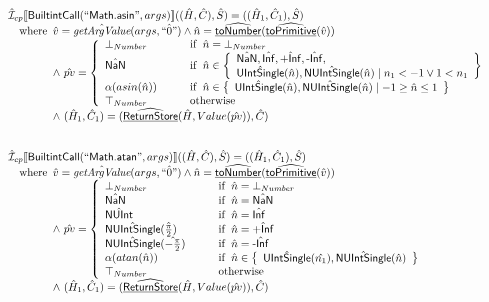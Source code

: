 \[\begin{array}{l}
\aI _{cp}\lbr \SF{BuiltintCall}(``\SF{Math.asin}",args)\rbr((\hat{H},\hat{C}), \hat{S})
  = ((\hat{H}_1, \hat{C}_1), \hat{S})\\
\quad\wherec{
  \hat{v}=\hat{\hf{getArgValue}}(args,\hat{``0"}) \land \hat{n}=\ahf{toNumber}(\ahf{toPrimitive}(\hat{v}))\\
  \land\ \hat{pv}   = 
  \left\{
    \begin{array}{l@{\quad\quad\quad}l}
      \bot_{Number} & \ifc{\hat{n} = \bot_{Number}}\\
      \hat{\SF{NaN}} & \ifc{\hat{n} \in \set{\hat{\SF{NaN}}, \hat{\SF{Inf}}, \hat{\SF{+Inf}}, \hat{\SF{-Inf}}, \\\hat{\SF{UIntSingle}}(\hat{n}), \hat{\SF{NUIntSingle}}(\hat{n}) \mid n_1<-1 \lor 1<n_1}}\\
      \alpha(asin(\hat{n})) & \ifc{\hat{n} \in \set{\hat{\SF{UIntSingle}}(\hat{n}), \hat{\SF{NUIntSingle}}(\hat{n}) \mid -1\geq \hat{n} \leq 1}}\\
      \top_{Number} & \owc\\
    \end{array}
  \right.\\
  \land\ (\hat{H}_1, \hat{C}_1) = (\ahf{ReturnStore}(\hat{H}, Value(\hat{pv})), \hat{C})
  }\\
\\\\



\aI _{cp}\lbr \SF{BuiltintCall}(``\SF{Math.atan}",args)\rbr((\hat{H},\hat{C}), \hat{S})
  = ((\hat{H}_1, \hat{C}_1), \hat{S})\\
\quad\wherec{
  \hat{v}=\hat{\hf{getArgValue}}(args,\hat{``0"}) \land \hat{n}=\ahf{toNumber}(\ahf{toPrimitive}(\hat{v}))\\
  \land\ \hat{pv}   = 
  \left\{
    \begin{array}{l@{\quad\quad\quad}l}
      \bot_{Number} & \ifc{\hat{n} = \bot_{Number}}\\
      \hat{\SF{NaN}} & \ifc{\hat{n} = \hat{\SF{NaN}}}\\
      \hat{\SF{NUInt}} & \ifc{\hat{n} = \hat{\SF{Inf}}}\\
      \hat{\SF{NUIntSingle}}(\hat{\frac{\pi}{2}}) & \ifc{\hat{n}=\hat{\SF{+Inf}}}\\
      \hat{\SF{NUIntSingle}}(\hat{-\frac{\pi}{2}}) & \ifc{\hat{n}=\hat{\SF{-Inf}}}\\
      \alpha(atan(\hat{n})) & \ifc{\hat{n} \in \set{\hat{\SF{UIntSingle}}(\hat{n_1}), \hat{\SF{NUIntSingle}}(\hat{n})}}\\
      \top_{Number} & \owc\\
    \end{array}
  \right.\\
  \land\ (\hat{H}_1, \hat{C}_1) = (\ahf{ReturnStore}(\hat{H}, Value(\hat{pv})), \hat{C})
  }\\
\\\\


\end{array}\]
